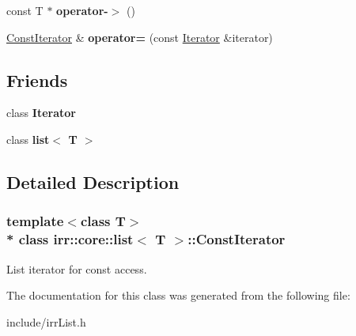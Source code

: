 \begin{DoxyCompactItemize}
\item 
const T $\ast$ {\bfseries operator-\/$>$} ()\hypertarget{classirr_1_1core_1_1list_1_1ConstIterator_a9f2fce6eb3279389b34c3a35b3d3ff8e}{}\label{classirr_1_1core_1_1list_1_1ConstIterator_a9f2fce6eb3279389b34c3a35b3d3ff8e}

\item 
\hyperlink{classirr_1_1core_1_1list_1_1ConstIterator}{Const\+Iterator} \& {\bfseries operator=} (const \hyperlink{classirr_1_1core_1_1list_1_1Iterator}{Iterator} \&iterator)\hypertarget{classirr_1_1core_1_1list_1_1ConstIterator_a203907f016f941b0f944f5b10304f392}{}\label{classirr_1_1core_1_1list_1_1ConstIterator_a203907f016f941b0f944f5b10304f392}

\end{DoxyCompactItemize}
\subsection*{Friends}
\begin{DoxyCompactItemize}
\item 
class {\bfseries Iterator}\hypertarget{classirr_1_1core_1_1list_1_1ConstIterator_a9830fc407400559db7e7783cc10a9394}{}\label{classirr_1_1core_1_1list_1_1ConstIterator_a9830fc407400559db7e7783cc10a9394}

\item 
class {\bfseries list$<$ T $>$}\hypertarget{classirr_1_1core_1_1list_1_1ConstIterator_ab6cf03d50c50087700b0fb872accfa7b}{}\label{classirr_1_1core_1_1list_1_1ConstIterator_ab6cf03d50c50087700b0fb872accfa7b}

\end{DoxyCompactItemize}


\subsection{Detailed Description}
\subsubsection*{template$<$class T$>$\\*
class irr\+::core\+::list$<$ T $>$\+::\+Const\+Iterator}

List iterator for const access. 

The documentation for this class was generated from the following file\+:\begin{DoxyCompactItemize}
\item 
include/irr\+List.\+h\end{DoxyCompactItemize}
